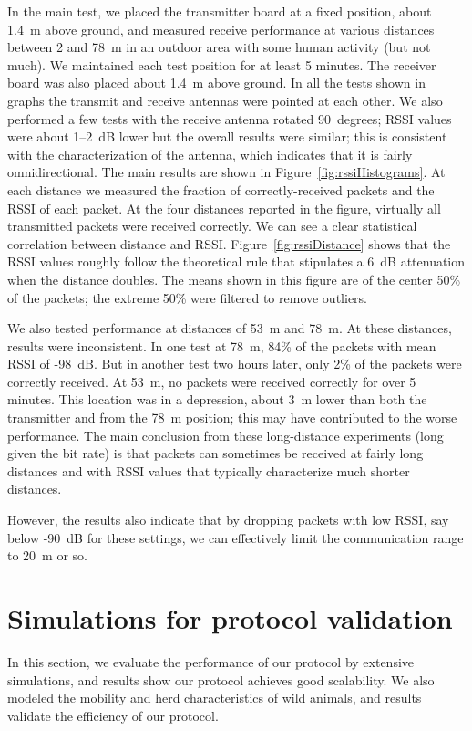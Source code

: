 In the main test, we placed the transmitter board at a fixed position, about 1.4~m above ground, and measured receive
performance at various distances between 2 and 78~m in an outdoor area with some human activity (but not much). We 
maintained each test position for at least 5 minutes.
The receiver board was also placed about 1.4~m above ground. In all the tests shown in graphs the transmit
and receive antennas were pointed at each other. We also performed a few tests with the receive antenna rotated 90~degrees;
RSSI values were about 1--2~dB lower but the overall results were similar; this is consistent with the characterization
of the antenna, which indicates that it is fairly omnidirectional.
The main results are shown in Figure~\ref{fig:rssiHistograms}.
At each distance we measured the fraction of correctly-received packets and the RSSI of each packet. At the four
distances reported in the figure, virtually all transmitted packets were received correctly. We can see a clear
statistical correlation between distance and RSSI. Figure~\ref{fig:rssiDistance} shows that the RSSI values
roughly follow the theoretical rule that stipulates a 6~dB attenuation when the distance doubles. The means
shown in this figure are of the center 50\% of the packets; the extreme 50\% were filtered to remove outliers.

We also tested performance at distances of 53~m and 78~m. At these distances, results were inconsistent. In one test
at 78~m, 84\% of the packets with mean RSSI of -98~dB. But in another test two hours later, only 2\% of the packets
were correctly received. At 53~m, no packets were received correctly for over 5 minutes. This location was in a depression,
about 3~m lower than both the transmitter and from the 78~m position; this may have contributed to the worse performance.
The main conclusion from these long-distance experiments (long given the bit rate) is that packets can sometimes be received
at fairly long distances and with RSSI values that typically characterize much shorter distances. 

However, the results also indicate that by dropping packets with low RSSI, say below -90~dB for these settings, we can
effectively limit the communication range to 20~m or so.


\section{Simulations for protocol validation}
\label{Simulations}

In this section,  
we evaluate the performance of our protocol by extensive simulations, 
and results show our protocol achieves good scalability. 
We also modeled the mobility and herd characteristics of wild animals,
and results validate the efficiency of our protocol.


